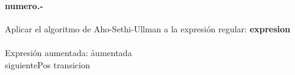 

\paragraph{{numero}.-}\label{p{numero}}
Aplicar el algoritmo de Aho-Sethi-Ullman a la expresión regular: \textbf{{expresion}} \\
\\
Expresión aumentada: \h{{aumentada}} \\


{siguientePos}
\quad
{transicion}